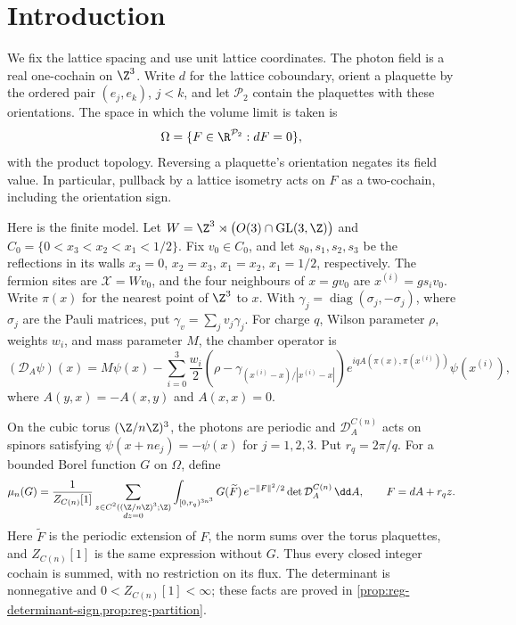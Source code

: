 \section{Introduction}\label{sec:introduction}

We fix the lattice spacing and use unit lattice coordinates. The photon
field is a real one-cochain on $\Z^3$. Write $d$ for the lattice
coboundary, orient a plaquette by the ordered pair $(e_j,e_k)$, $j<k$,
and let $\mathcal P_2$ contain the plaquettes with these orientations.
The space in which the volume limit is taken is
\[
 \Omega=\{F\in\R^{\mathcal P_2}:dF=0\},
\]
with the product topology. Reversing a plaquette's orientation negates
its field value. In particular, pullback by a lattice isometry acts on
$F$ as a two-cochain, including the orientation sign.

Here is the finite model. Let
$W=\Z^3\rtimes\bigl(O(3)\cap\operatorname{GL}(3,\Z)\bigr)$ and
$C_0=\{0<x_3<x_2<x_1<1/2\}$. Fix $v_0\in C_0$, and let
$s_0,s_1,s_2,s_3$ be the reflections in its walls
$x_3=0$, $x_2=x_3$, $x_1=x_2$, $x_1=1/2$, respectively.
The fermion sites are $\mathcal X=Wv_0$, and the four neighbours
of $x=gv_0$ are $x^{(i)}=gs_iv_0$. Write $\pi(x)$ for the nearest
point of $\Z^3$ to $x$. With $\gamma_j=\operatorname{diag}(\sigma_j,-\sigma_j)$,
where $\sigma_j$ are the Pauli matrices, put $\gamma_v=\sum_jv_j\gamma_j$.
For charge $q$, Wilson parameter $\rho$, weights $w_i$, and mass
parameter $M$, the chamber operator is
\[
 (\mathcal D_A\psi)(x)
 =M\psi(x)-\sum_{i=0}^3\frac{w_i}{2}
   \left(\rho-\gamma_{(x^{(i)}-x)/|x^{(i)}-x|}\right)
   e^{iqA(\pi(x),\pi(x^{(i)}))}\psi(x^{(i)}),
\]
where $A(y,x)=-A(x,y)$ and $A(x,x)=0$.

On the cubic torus $(\Z/n\Z)^3$, the photons are periodic and
$\mathcal D_A^{C(n)}$ acts on spinors satisfying
$\psi(x+ne_j)=-\psi(x)$ for $j=1,2,3$. Put $r_q=2\pi/q$.
For a bounded Borel function $G$ on $\Omega$, define
\[
 \mu_n(G)=\frac1{Z_{C(n)}[1]}
 \sum_{\substack{z\in C^2((\Z/n\Z)^3;\Z)\\dz=0}}
 \int_{[0,r_q)^{3n^3}}
 G(\widetilde F)\,e^{-\|F\|^2/2}
       \det\mathcal D_A^{C(n)}\,\dd A,
 \qquad F=dA+r_qz.
\]
Here $\widetilde F$ is the periodic extension of $F$, the norm sums
over the torus plaquettes, and $Z_{C(n)}[1]$ is the same expression
without $G$. Thus every closed integer cochain is summed, with no
restriction on its flux. The determinant is nonnegative and
$0<Z_{C(n)}[1]<\infty$; these facts are proved in
\cref{prop:reg-determinant-sign,prop:reg-partition}.

